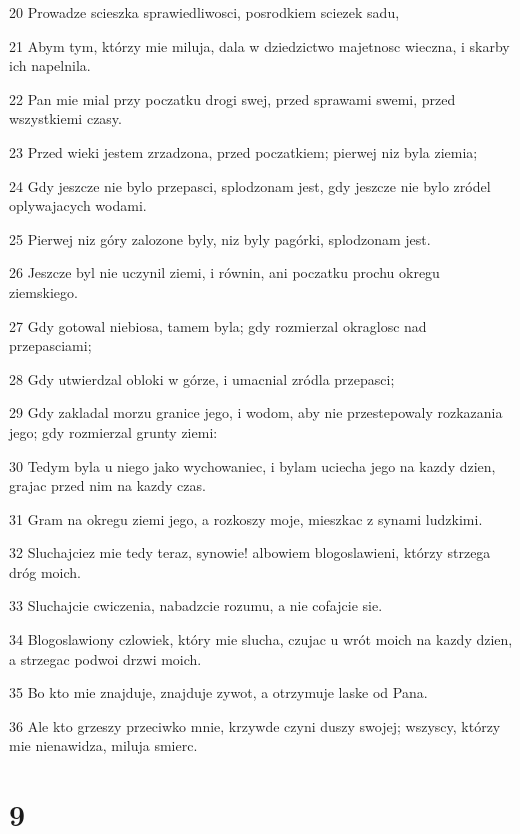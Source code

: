 \par 20 Prowadze scieszka sprawiedliwosci, posrodkiem sciezek sadu,
\par 21 Abym tym, którzy mie miluja, dala w dziedzictwo majetnosc wieczna, i skarby ich napelnila.
\par 22 Pan mie mial przy poczatku drogi swej, przed sprawami swemi, przed wszystkiemi czasy.
\par 23 Przed wieki jestem zrzadzona, przed poczatkiem; pierwej niz byla ziemia;
\par 24 Gdy jeszcze nie bylo przepasci, splodzonam jest, gdy jeszcze nie bylo zródel oplywajacych wodami.
\par 25 Pierwej niz góry zalozone byly, niz byly pagórki, splodzonam jest.
\par 26 Jeszcze byl nie uczynil ziemi, i równin, ani poczatku prochu okregu ziemskiego.
\par 27 Gdy gotowal niebiosa, tamem byla; gdy rozmierzal okraglosc nad przepasciami;
\par 28 Gdy utwierdzal obloki w górze, i umacnial zródla przepasci;
\par 29 Gdy zakladal morzu granice jego, i wodom, aby nie przestepowaly rozkazania jego; gdy rozmierzal grunty ziemi:
\par 30 Tedym byla u niego jako wychowaniec, i bylam uciecha jego na kazdy dzien, grajac przed nim na kazdy czas.
\par 31 Gram na okregu ziemi jego, a rozkoszy moje, mieszkac z synami ludzkimi.
\par 32 Sluchajciez mie tedy teraz, synowie! albowiem blogoslawieni, którzy strzega dróg moich.
\par 33 Sluchajcie cwiczenia, nabadzcie rozumu, a nie cofajcie sie.
\par 34 Blogoslawiony czlowiek, który mie slucha, czujac u wrót moich na kazdy dzien, a strzegac podwoi drzwi moich.
\par 35 Bo kto mie znajduje, znajduje zywot, a otrzymuje laske od Pana.
\par 36 Ale kto grzeszy przeciwko mnie, krzywde czyni duszy swojej; wszyscy, którzy mie nienawidza, miluja smierc.

\chapter{9}

